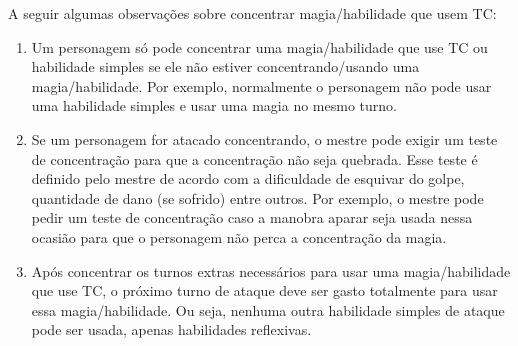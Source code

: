 A seguir algumas observações sobre concentrar magia/habilidade que usem TC:
\begin{enumerate}

	\item Um personagem só pode concentrar uma magia/habilidade que use TC ou habilidade simples se ele não estiver concentrando/usando uma magia/habilidade. Por exemplo, normalmente o personagem não pode usar uma habilidade simples e usar uma magia no mesmo turno.

	

	\item Se um personagem for atacado concentrando, o mestre pode exigir um teste de concentração para que a concentração não seja quebrada. Esse teste é definido pelo mestre de acordo com a dificuldade de esquivar do golpe, quantidade de dano (se sofrido) entre outros. Por exemplo, o mestre pode pedir um teste de concentração caso a manobra aparar seja usada nessa ocasião para que o personagem não perca a concentração da magia.

	\item Após concentrar os turnos extras necessários para usar uma magia/habilidade que use TC, o próximo turno de ataque deve ser gasto totalmente para usar essa magia/habilidade. Ou seja, nenhuma outra habilidade simples de ataque pode ser usada, apenas habilidades reflexivas.

\end{enumerate}


